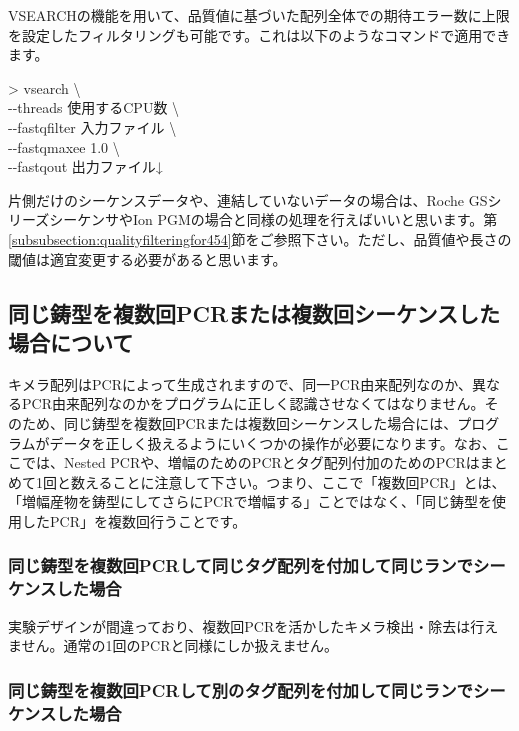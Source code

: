 \documentclass[titlepage,10pt,a4paper]{jsbook}
\newenvironment{cmd}{\begin{oframed}\raggedright\ttfamily\footnotesize\setlength{\baselineskip}{1.4em}}{\end{oframed}\vspace{-1em}}
\begin{document}
VSEARCHの機能を用いて、品質値に基づいた配列全体での期待エラー数に上限を設定したフィルタリングも可能です。これは以下のようなコマンドで適用できます。

\begin{cmd}
{\textgreater} vsearch {\textbackslash}\\
{-}{-}threads 使用するCPU数 {\textbackslash}\\
{-}{-}fastq{\textunderscore}filter 入力ファイル {\textbackslash}\\
{-}{-}fastq{\textunderscore}maxee 1.0 {\textbackslash}\\
{-}{-}fastqout 出力ファイル↓
\end{cmd}

片側だけのシーケンスデータや、連結していないデータの場合は、Roche GSシリーズシーケンサやIon PGMの場合と同様の処理を行えばいいと思います。第\ref{subsubsection:qualityfilteringfor454}節をご参照下さい。ただし、品質値や長さの閾値は適宜変更する必要があると思います。

\subsection{同じ鋳型を複数回PCRまたは複数回シーケンスした場合について}

キメラ配列はPCRによって生成されますので、同一PCR由来配列なのか、異なるPCR由来配列なのかをプログラムに正しく認識させなくてはなりません。そのため、同じ鋳型を複数回PCRまたは複数回シーケンスした場合には、プログラムがデータを正しく扱えるようにいくつかの操作が必要になります。なお、ここでは、Nested PCRや、増幅のためのPCRとタグ配列付加のためのPCRはまとめて1回と数えることに注意して下さい。つまり、ここで「複数回PCR」とは、「増幅産物を鋳型にしてさらにPCRで増幅する」ことではなく、「同じ鋳型を使用したPCR」を複数回行うことです。

\subsubsection{同じ鋳型を複数回PCRして同じタグ配列を付加して同じランでシーケンスした場合}

実験デザインが間違っており、複数回PCRを活かしたキメラ検出・除去は行えません。通常の1回のPCRと同様にしか扱えません。

\subsubsection{同じ鋳型を複数回PCRして別のタグ配列を付加して同じランでシーケンスした場合}
\end{document}
